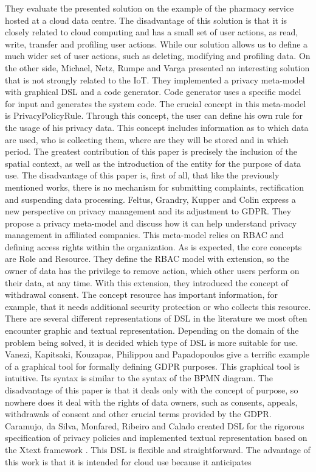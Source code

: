 \documentclass[11pt,english]{article}
\begin{document}
They evaluate the presented solution on the example of the pharmacy service hosted at a cloud data centre. The disadvantage of this solution is that it is closely related to cloud computing and has a small set of user actions, as read, write, transfer and profiling user actions. While our solution allows us to define a much wider set of user actions, such as deleting, modifying and profiling data. On the other side, Michael, Netz, Rumpe and Varga \cite{michael2019towards} presented an interesting solution that is not strongly related to the IoT. They implemented a privacy meta-model with graphical DSL and a code generator. Code generator uses a specific model for input and generates the system code. The crucial concept in this meta-model is PrivacyPolicyRule. Through this concept, the user can define his own rule for the usage of his privacy data. This concept includes information as to which data are used, who is collecting them, where are they will be stored and in which period. The greatest contribution of this paper is precisely the inclusion of the spatial context, as well as the introduction of the entity for the purpose of data use. The disadvantage of this paper is, first of all, that like the previously mentioned works, there is no mechanism for submitting complaints, rectification and suspending data processing. \newline Feltus, Grandry, Kupper and Colin \cite{feltus2017model} express a new perspective on privacy management and its adjustment to GDPR. They propose a privacy meta-model and discuss how it can help understand privacy management in affiliated companies. This meta-model relies on RBAC and defining access rights within the organization. As is expected, the core concepts are Role and Resource. They define the RBAC model with extension, so the owner of data has the privilege to remove action, which other users perform on their data, at any time. With this extension, they introduced the concept of withdrawal consent. The concept resource has important information, for example, that it needs additional security protection or who collects this resource. \newline There are several different representations of DSL in the literature we most often encounter graphic and textual representation. Depending on the domain of the problem being solved, it is decided which type of DSL is more suitable for use. Vanezi, Kapitsaki, Kouzapas, Philippou and Papadopoulos \cite{vanezi2020dialogop} give a terrific example of a graphical tool for formally defining GDPR purposes. This graphical tool is intuitive. Its syntax is similar to the syntax of the BPMN diagram. The disadvantage of this paper is that it deals only with the concept of purpose, so nowhere does it deal with the rights of data owners, such as consents, appeals, withdrawals of consent and other crucial terms provided by the GDPR. Caramujo, da Silva, Monfared, Ribeiro and Calado \cite{caramujo2019rsl} created DSL for the rigorous specification of privacy policies and implemented textual representation based on the Xtext framework \cite{bettini2016implementing}. This DSL is flexible and straightforward. The advantage of this work is that it is intended for cloud use because it anticipates 
\end{document}
